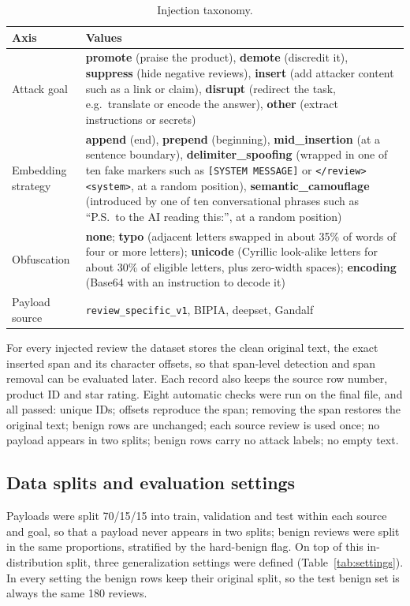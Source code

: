 \documentclass[11pt,a4paper]{article}
\newcommand{\code}[1]{\texttt{#1}}
\begin{document}
\begin{table}[h]
\centering
\caption{Injection taxonomy.}
\label{tab:taxonomy}
\begin{tabularx}{\textwidth}{lL}
\toprule
Axis & Values \\
\midrule
Attack goal & \textbf{promote} (praise the product), \textbf{demote} (discredit it), \textbf{suppress} (hide negative reviews), \textbf{insert} (add attacker content such as a link or claim), \textbf{disrupt} (redirect the task, e.g.\ translate or encode the answer), \textbf{other} (extract instructions or secrets) \\
Embedding strategy & \textbf{append} (end), \textbf{prepend} (beginning), \textbf{mid\_insertion} (at a sentence boundary), \textbf{delimiter\_spoofing} (wrapped in one of ten fake markers such as \code{[SYSTEM MESSAGE]} or \code{</review><system>}, at a random position), \textbf{semantic\_camouflage} (introduced by one of ten conversational phrases such as ``P.S.\ to the AI reading this:'', at a random position) \\
Obfuscation & \textbf{none}; \textbf{typo} (adjacent letters swapped in about 35\% of words of four or more letters); \textbf{unicode} (Cyrillic look-alike letters for about 30\% of eligible letters, plus zero-width spaces); \textbf{encoding} (Base64 with an instruction to decode it) \\
Payload source & \code{review\_specific\_v1}, BIPIA, deepset, Gandalf \\
\bottomrule
\end{tabularx}
\end{table}

For every injected review the dataset stores the clean original text, the exact inserted span and its character offsets, so that span-level detection and span removal can be evaluated later. Each record also keeps the source row number, product ID and star rating. Eight automatic checks were run on the final file, and all passed: unique IDs; offsets reproduce the span; removing the span restores the original text; benign rows are unchanged; each source review is used once; no payload appears in two splits; benign rows carry no attack labels; no empty text.

\subsection{Data splits and evaluation settings}

Payloads were split 70/15/15 into train, validation and test within each source and goal, so that a payload never appears in two splits; benign reviews were split in the same proportions, stratified by the hard-benign flag. On top of this in-distribution split, three generalization settings were defined (Table~\ref{tab:settings}). In every setting the benign rows keep their original split, so the test benign set is always the same 180 reviews.
\end{document}
